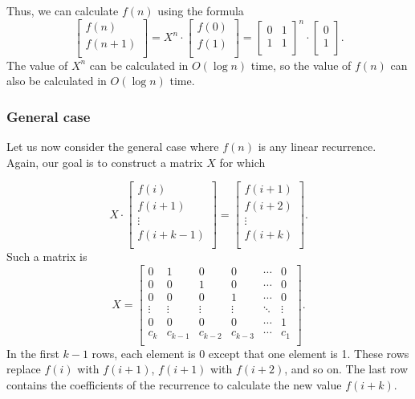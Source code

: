 Thus, we can calculate $f(n)$ using the formula
\[
    \begin{bmatrix}
        f(n)   \\
        f(n+1) \\
    \end{bmatrix}
    =
    X^n \cdot
    \begin{bmatrix}
        f(0) \\
        f(1) \\
    \end{bmatrix}
    =
    \begin{bmatrix}
        0 & 1 \\
        1 & 1 \\
    \end{bmatrix}^n
    \cdot
    \begin{bmatrix}
        0 \\
        1 \\
    \end{bmatrix}.
\]
The value of $X^n$ can be calculated in
$O(\log n)$ time,
so the value of $f(n)$ can also be calculated
in $O(\log n)$ time.

\subsubsection{General case}

Let us now consider the general case where
$f(n)$ is any linear recurrence.
Again, our goal is to construct a matrix $X$
for which

\[ X \cdot
    \begin{bmatrix}
        f(i)     \\
        f(i+1)   \\
        \vdots   \\
        f(i+k-1) \\
    \end{bmatrix}
    =
    \begin{bmatrix}
        f(i+1) \\
        f(i+2) \\
        \vdots \\
        f(i+k) \\
    \end{bmatrix}.
\]
Such a matrix is
\[
    X =
    \begin{bmatrix}
        0      & 1       & 0       & 0       & \cdots & 0      \\
        0      & 0       & 1       & 0       & \cdots & 0      \\
        0      & 0       & 0       & 1       & \cdots & 0      \\
        \vdots & \vdots  & \vdots  & \vdots  & \ddots & \vdots \\
        0      & 0       & 0       & 0       & \cdots & 1      \\
        c_k    & c_{k-1} & c_{k-2} & c_{k-3} & \cdots & c_1    \\
    \end{bmatrix}.
\]
In the first $k-1$ rows, each element is 0
except that one element is 1.
These rows replace $f(i)$ with $f(i+1)$,
$f(i+1)$ with $f(i+2)$, and so on.
The last row contains the coefficients of the recurrence
to calculate the new value $f(i+k)$.

